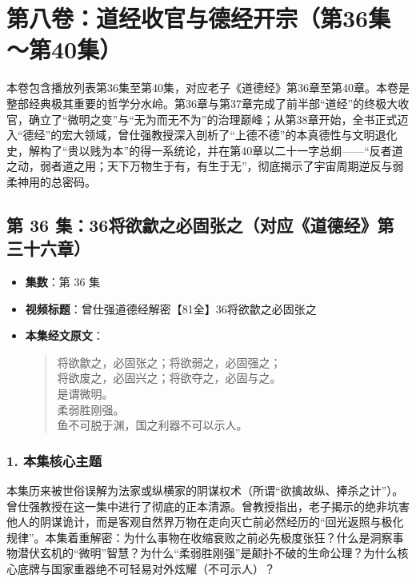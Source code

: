 \section*{第八卷：道经收官与德经开宗（第36集～第40集）}

本卷包含播放列表第36集至第40集，对应老子《道德经》第36章至第40章。本卷是整部经典极其重要的哲学分水岭。第36章与第37章完成了前半部“道经”的终极大收官，确立了“微明之变”与“无为而无不为”的治理巅峰；从第38章开始，全书正式迈入“德经”的宏大领域，曾仕强教授深入剖析了“上德不德”的本真德性与文明退化史，解构了“贵以贱为本”的得一系统论，并在第40章以二十一字总纲——“反者道之动，弱者道之用；天下万物生于有，有生于无”，彻底揭示了宇宙周期逆反与弱柔神用的总密码。

\clearpage

\subsection{第 36 集：36将欲歙之必固张之（对应《道德经》第三十六章）}
\label{sec:ep36}

\begin{itemize}
    \item \textbf{集数}：第 36 集
    \item \textbf{视频标题}：曾仕强道德经解密【81全】36将欲歙之必固张之
    
    \item \textbf{本集经文原文}：
    \begin{quote}\kaishu
    将欲歙之，必固张之；将欲弱之，必固强之；\\
    将欲废之，必固兴之；将欲夺之，必固与之。\\
    是谓微明。\\
    柔弱胜刚强。\\
    鱼不可脱于渊，国之利器不可以示人。
    \end{quote}
\end{itemize}

\subsubsection{1. 本集核心主题}
本集历来被世俗误解为法家或纵横家的阴谋权术（所谓“欲擒故纵、捧杀之计”）。曾仕强教授在这一集中进行了彻底的正本清源。曾教授指出，老子揭示的绝非坑害他人的阴谋诡计，而是客观自然界万物在走向灭亡前必然经历的“回光返照与极化规律”。本集着重解密：为什么事物在收缩衰败之前必先极度张狂？什么是洞察事物潜伏玄机的“微明”智慧？为什么“柔弱胜刚强”是颠扑不破的生命公理？为什么核心底牌与国家重器绝不可轻易对外炫耀（不可示人）？

